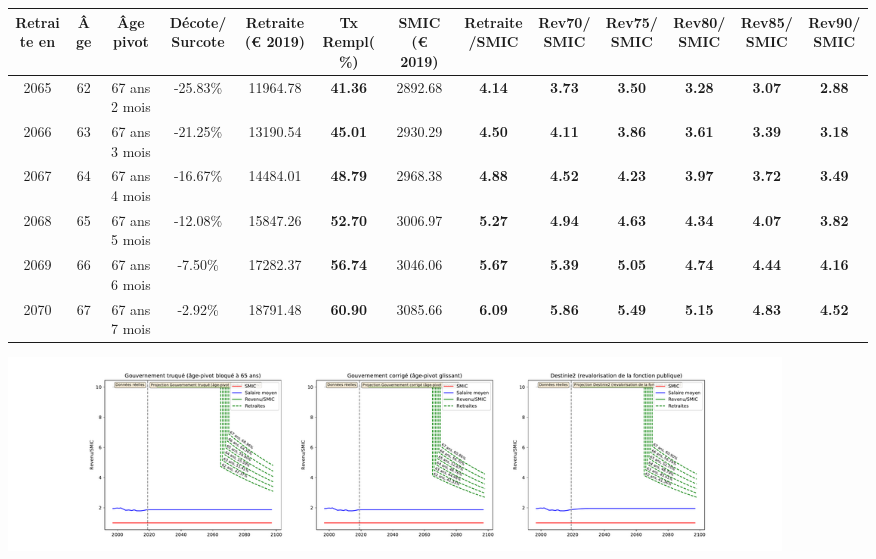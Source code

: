 { \scriptsize \begin{center} 
\begin{tabular}[htb]{|c|c||c|c||c|c||c||c|c|c|c|c|c|} 
\hline 
 Retraite en &  Âge &  Âge pivot &  Décote/Surcote &  Retraite (\euro{} 2019) &  Tx Rempl(\%) &  SMIC (\euro{} 2019) &  Retraite/SMIC &  Rev70/SMIC &  Rev75/SMIC &  Rev80/SMIC &  Rev85/SMIC &  Rev90/SMIC \\ 
\hline \hline 
 2065 &  62 &  67 ans 2 mois &  -25.83\% &  11964.78 &  {\bf 41.36} &  2892.68 &  {\bf 4.14} &  {\bf 3.73} &  {\bf 3.50} &  {\bf 3.28} &  {\bf 3.07} &  {\bf 2.88} \\ 
\hline 
 2066 &  63 &  67 ans 3 mois &  -21.25\% &  13190.54 &  {\bf 45.01} &  2930.29 &  {\bf 4.50} &  {\bf 4.11} &  {\bf 3.86} &  {\bf 3.61} &  {\bf 3.39} &  {\bf 3.18} \\ 
\hline 
 2067 &  64 &  67 ans 4 mois &  -16.67\% &  14484.01 &  {\bf 48.79} &  2968.38 &  {\bf 4.88} &  {\bf 4.52} &  {\bf 4.23} &  {\bf 3.97} &  {\bf 3.72} &  {\bf 3.49} \\ 
\hline 
 2068 &  65 &  67 ans 5 mois &  -12.08\% &  15847.26 &  {\bf 52.70} &  3006.97 &  {\bf 5.27} &  {\bf 4.94} &  {\bf 4.63} &  {\bf 4.34} &  {\bf 4.07} &  {\bf 3.82} \\ 
\hline 
 2069 &  66 &  67 ans 6 mois &  -7.50\% &  17282.37 &  {\bf 56.74} &  3046.06 &  {\bf 5.67} &  {\bf 5.39} &  {\bf 5.05} &  {\bf 4.74} &  {\bf 4.44} &  {\bf 4.16} \\ 
\hline 
 2070 &  67 &  67 ans 7 mois &  -2.92\% &  18791.48 &  {\bf 60.90} &  3085.66 &  {\bf 6.09} &  {\bf 5.86} &  {\bf 5.49} &  {\bf 5.15} &  {\bf 4.83} &  {\bf 4.52} \\ 
\hline 
\hline 
\end{tabular} 
\end{center} } 

 \begin{center}\includegraphics[width=0.9\textwidth]{fig/Riche_2003_22_dest_retraite.pdf}\end{center} \label{fig/Riche_2003_22_dest_retraite.pdf} 

\newpage 
 
